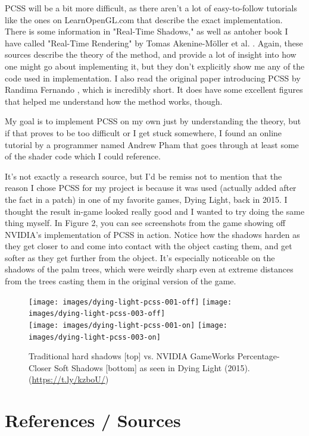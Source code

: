 \documentclass{article}
\begin{document}
PCSS will be a bit more difficult, as there aren't a lot of easy-to-follow tutorials like the ones on LearnOpenGL.com that describe the exact implementation. There is some information in "Real-Time Shadows," as well as antoher book I have called "Real-Time Rendering" by Tomas Akenine-Möller et al. \cite{akenine2019real}. Again, these sources describe the theory of the method, and provide a lot of insight into how one might go about implementing it, but they don't explicitly show me any of the code used in implementation. I also read the original paper introducing PCSS by Randima Fernando \cite{ctx12351924680002341}, which is incredibly short. It does have some excellent figures that helped me understand how the method works, though.

My goal is to implement PCSS on my own just by understanding the theory, but if that proves to be too difficult or I get stuck somewhere, I found an online tutorial by a programmer named Andrew Pham \cite{pham_2020} that goes through at least some of the shader code which I could reference.

It's not exactly a research source, but I'd be remiss not to mention that the reason I chose PCSS for my project is because it was used (actually added after the fact in a patch) in one of my favorite games, Dying Light, back in 2015. I thought the result in-game looked really good and I wanted to try doing the same thing myself. In Figure 2, you can see screenshots from the game showing off NVIDIA's implementation of PCSS in action. Notice how the shadows harden as they get closer to and come into contact with the object casting them, and get softer as they get further from the object. It's especially noticeable on the shadows of the palm trees, which were weirdly sharp even at extreme distances from the trees casting them in the original version of the game.

\begin{figure}
	\texttt{[image: images/dying-light-pcss-001-off]}\hfill
	\texttt{[image: images/dying-light-pcss-003-off]}
	\\[\smallskipamount]
	\texttt{[image: images/dying-light-pcss-001-on]}\hfill
	\texttt{[image: images/dying-light-pcss-003-on]}
	\caption{Traditional hard shadows [top] vs. NVIDIA GameWorks Percentage-Closer Soft Shadows [bottom] as seen in Dying Light (2015). (\url{https://t.ly/kzboU/})}
\end{figure}


\section{References / Sources} %




\end{document}
